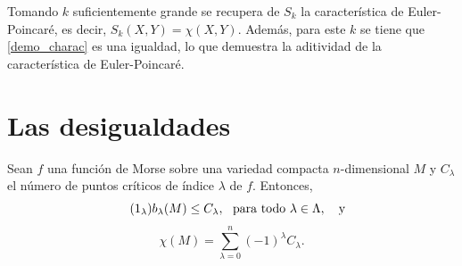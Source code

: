 \begin{remark}
\label{demo_adit_euler}
    Tomando $k$ suficientemente grande se recupera de $S_k$ la característica de Euler-Poincaré, es decir, $S_k(X,Y)=\chi(X,Y)$. Además, para este $k$ se tiene que \ref{demo_charac} es una igualdad, lo que demuestra la aditividad de la  característica de Euler-Poincaré.
\end{remark}

\bigskip

\section{Las desigualdades}
\label{sec:desigmorse}
\begin{theorem}
\label{weak_morse_desig}
    Sean $f$ una función de Morse sobre una variedad compacta $n$-dimensional $M$  y $C_{\lambda}$ el número de puntos críticos de índice $\lambda$ de $f$. Entonces,
    \begin{equation}
    \label{weak_morse_desig1}
    \tag{$1_{\lambda}$}
        b_{\lambda}(M) \le C_{\lambda},~\text{ para todo } \lambda\in\Lambda, ~~\text{ y }~~ 
    \end{equation}
    \begin{equation}
    \label{weak_morse_desig2}
    \tag{2}
        \chi(M) = \sum_{\lambda=0}^{n} (-1)^{\lambda} C_{\lambda}.
    \end{equation}
\end{theorem}
